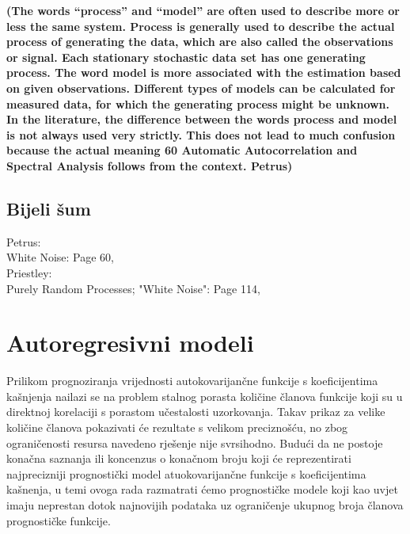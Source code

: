 \documentclass[a4paper,12pt,oneside]{memoir}
\begin{document}
            \textbf{(The words “process” and “model” are often used to describe more or less the same
            system. Process is generally used to describe the actual process of generating the
            data, which are also called the observations or signal. Each stationary stochastic
            data set has one generating process. The word model is more associated with the
            estimation based on given observations. Different types of models can be calculated
            for measured data, for which the generating process might be unknown. In the
            literature, the difference between the words process and model is not always used
            very strictly. This does not lead to much confusion because the actual meaning
            60 Automatic Autocorrelation and Spectral Analysis
            follows from the context. Petrus)}
   
    
        
        \section{Bijeli šum}
                Petrus:\\
                    White Noise: Page 60,\\

                Priestley:\\
                    Purely Random Processes; "White Noise": Page 114,\\

    \chapter{Autoregresivni modeli}
            
        Prilikom prognoziranja vrijednosti autokovarijančne funkcije s koeficijentima kašnjenja nailazi se na problem stalnog porasta količine članova funkcije koji su u direktnoj korelaciji s porastom učestalosti uzorkovanja. Takav prikaz za velike količine članova pokazivati će rezultate s velikom preciznošću, no zbog ograničenosti resursa navedeno rješenje nije svrsihodno. Budući da ne postoje konačna saznanja ili koncenzus o konačnom broju koji će reprezentirati najprecizniji prognostički model atuokovarijančne funkcije s koeficijentima kašnenja, u temi ovoga rada razmatrati ćemo prognostičke modele koji kao uvjet imaju neprestan dotok najnovijih podataka uz ograničenje ukupnog broja članova prognostičke funkcije.
\end{document}

